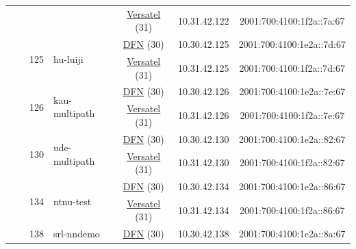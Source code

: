 \begin{small}
\begin{center}
\begin{longtable}{|c|c|c|c|c|c|c|c|}
  &  &  &  & \multicolumn{2}{|c|}{\tiny{\href{http://www.versatel.de}{Versatel} (31)}} & \tiny{10.31.42.122} & \tiny{2001:700:4100:1f2a::7a:67} \\* \cline{3-3}\cline{4-4}\cline{5-5}\cline{6-6}\cline{7-7}\cline{8-8}
  &  & \multirow{2}{*}{\tiny{125}} & \multicolumn{1}{|l|}{\multirow{2}{*}{\tiny{hu-luiji}}} & \multicolumn{2}{|c|}{\tiny{\href{https://www.dfn.de}{DFN} (30)}} & \tiny{10.30.42.125} & \tiny{2001:700:4100:1e2a::7d:67} \\* \cline{5-5}\cline{6-6}\cline{7-7}\cline{8-8}
  &  &  &  & \multicolumn{2}{|c|}{\tiny{\href{http://www.versatel.de}{Versatel} (31)}} & \tiny{10.31.42.125} & \tiny{2001:700:4100:1f2a::7d:67} \\* \cline{3-3}\cline{4-4}\cline{5-5}\cline{6-6}\cline{7-7}\cline{8-8}
  &  & \multirow{2}{*}{\tiny{126}} & \multicolumn{1}{|l|}{\multirow{2}{*}{\tiny{kau-multipath}}} & \multicolumn{2}{|c|}{\tiny{\href{https://www.dfn.de}{DFN} (30)}} & \tiny{10.30.42.126} & \tiny{2001:700:4100:1e2a::7e:67} \\* \cline{5-5}\cline{6-6}\cline{7-7}\cline{8-8}
  &  &  &  & \multicolumn{2}{|c|}{\tiny{\href{http://www.versatel.de}{Versatel} (31)}} & \tiny{10.31.42.126} & \tiny{2001:700:4100:1f2a::7e:67} \\* \cline{3-3}\cline{4-4}\cline{5-5}\cline{6-6}\cline{7-7}\cline{8-8}
  &  & \multirow{2}{*}{\tiny{130}} & \multicolumn{1}{|l|}{\multirow{2}{*}{\tiny{ude-multipath}}} & \multicolumn{2}{|c|}{\tiny{\href{https://www.dfn.de}{DFN} (30)}} & \tiny{10.30.42.130} & \tiny{2001:700:4100:1e2a::82:67} \\* \cline{5-5}\cline{6-6}\cline{7-7}\cline{8-8}
  &  &  &  & \multicolumn{2}{|c|}{\tiny{\href{http://www.versatel.de}{Versatel} (31)}} & \tiny{10.31.42.130} & \tiny{2001:700:4100:1f2a::82:67} \\* \cline{3-3}\cline{4-4}\cline{5-5}\cline{6-6}\cline{7-7}\cline{8-8}
  &  & \multirow{2}{*}{\tiny{134}} & \multicolumn{1}{|l|}{\multirow{2}{*}{\tiny{ntnu-test}}} & \multicolumn{2}{|c|}{\tiny{\href{https://www.dfn.de}{DFN} (30)}} & \tiny{10.30.42.134} & \tiny{2001:700:4100:1e2a::86:67} \\* \cline{5-5}\cline{6-6}\cline{7-7}\cline{8-8}
  &  &  &  & \multicolumn{2}{|c|}{\tiny{\href{http://www.versatel.de}{Versatel} (31)}} & \tiny{10.31.42.134} & \tiny{2001:700:4100:1f2a::86:67} \\* \cline{3-3}\cline{4-4}\cline{5-5}\cline{6-6}\cline{7-7}\cline{8-8}
  &  & \multirow{2}{*}{\tiny{138}} & \multicolumn{1}{|l|}{\multirow{2}{*}{\tiny{srl-nndemo}}} & \multicolumn{2}{|c|}{\tiny{\href{https://www.dfn.de}{DFN} (30)}} & \tiny{10.30.42.138} & \tiny{2001:700:4100:1e2a::8a:67} \\* \cline{5-5}\cline{6-6}\cline{7-7}\cline{8-8}

\end{longtable}
\end{center}
\end{small}
